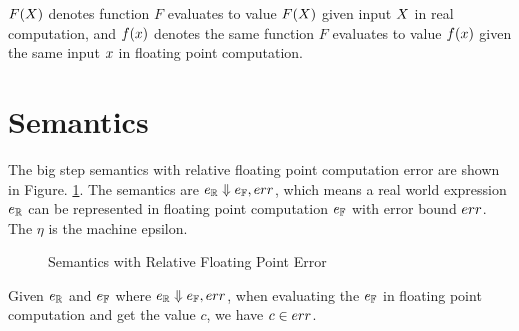 \documentclass[a4paper,11pt]{article}
\begin{document}
$F(X)$ denotes function $F$ evaluates to value $F(X)$ given input $X$ in real computation, and $f(x)$ denotes the same function $F$ evaluates to value $f(x)$ given the same input $x$ in floating point computation.

\section{Semantics}

The big step semantics with relative floating point computation error are shown in Figure. \ref{fig_semantics_rel}. The semantics are $e_{\mathbb{R}} \Downarrow e_{\mathbb{F}}, err$, which means a real world expression $e_{\mathbb{R}}$ can be represented in floating point computation $e_{\mathbb{F}}$ with error bound $err$. The $\eta$ is the machine epsilon.

\begin{figure}
\caption{Semantics with Relative Floating Point Error}
\label{fig_semantics_rel}
\end{figure}


\begin{thm}
Given $e_{\mathbb{R}}$ and $e_{\mathbb{F}}$ where  $e_{\mathbb{R}} \Downarrow e_{\mathbb{F}}, err$, when evaluating the $e_{\mathbb{F}}$ in floating point computation and get the value $c$, we have $c \in err$.
\end{thm}
\end{document}

